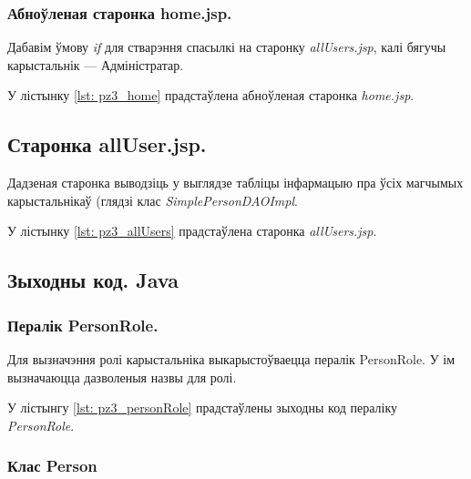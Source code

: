 \subsubsection{Абноўленая старонка home.jsp.}

Дабавім ўмову \textit{if} для стварэння спасылкі на старонку
\textit{allUsers.jsp}, калі бягучы карыстальнік --- Адміністратар.

У лістынку \ref{lst: pz3_home} прадстаўлена абноўленая старонка
\textit{home.jsp}.



\subsection{Старонка allUser.jsp.}

Дадзеная старонка выводзіць у выглядзе табліцы
інфармацыю пра ўсіх магчымых карыстальнікаў (глядзі клас
\textit{SimplePersonDAOImpl}.

У лістынку \ref{lst: pz3_allUsers} прадстаўлена старонка
\textit{allUsers.jsp}.



\subsection{Зыходны код. Java}

\subsubsection{Пералік PersonRole.}

Для вызначэння ролі карыстальніка выкарыстоўваецца пералік PersonRole.
У ім вызначаюцца дазволеныя назвы для ролі.

У лістынгу \ref{lst: pz3_personRole} прадстаўлены зыходны код пераліку \textit{PersonRole}.



\vspace{-\baselineskip}
\subsubsection{Клас Person}

